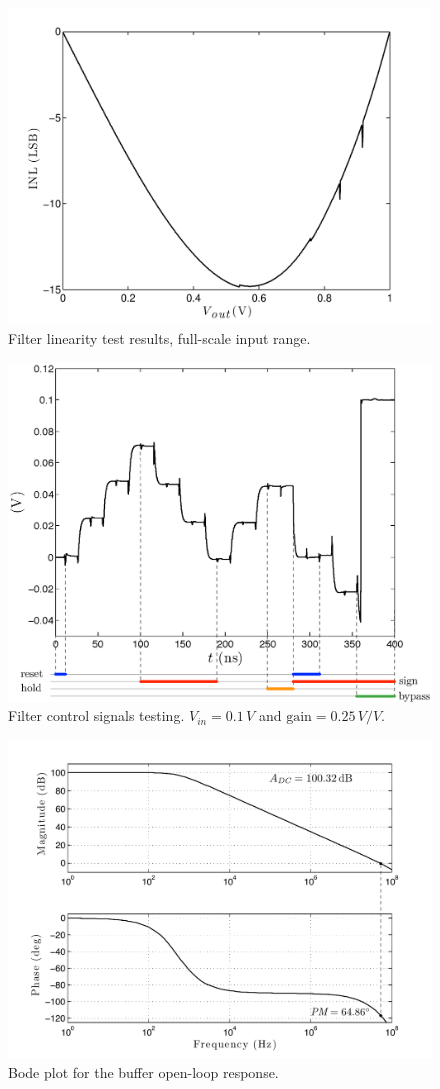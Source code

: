 \begin{figure}[!t]
	\centering
	\includegraphics[width=4.4in]{./Test/linearity.pdf}
	\caption{Filter linearity test results, full-scale input range.}\label{fig:gain_curves}
\end{figure}


\begin{figure}[!t]
	\centering
	\includegraphics[width=5in]{./Test/test_filter_after_omni.eps}
	\caption{Filter control signals testing. $V_\textit{in}=0.1\,V$ and $\text{gain}=0.25\,V/V$.}\label{fig:test_filter_after_omni}
\end{figure}




\begin{figure}[!t]
	\centering
	\includegraphics[width=5.3in]{./Test/bode_buffer_post}
	\caption{Bode plot for the buffer open-loop response.}\label{fig:bode_buffer}
\end{figure}